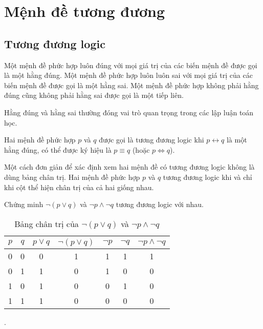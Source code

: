 \documentclass{standalone} %
\begin{document}

    \section{Mệnh đề tương đương}
    \subsection{Tương đương logic} 
        \begin{definition}
            Một mệnh đề phức hợp luôn đúng với mọi giá trị của các biến mệnh đề được gọi là một hằng đúng. Một mệnh đề phức hợp luôn luôn sai với mọi giá trị của các biến mệnh đề được gọi là một hằng sai. Một mệnh đề phức hợp không phải hằng đúng cũng không phải hằng sai được gọi là một tiếp liên.
        \end{definition}
        
        Hằng đúng và hằng sai thường đóng vai trò quan trọng trong các lập luận toán học.
        
        \begin{definition}
            Hai mệnh đề phức hợp $p$ và $q$ được gọi là tương đương logic khi $p \leftrightarrow q$ là một hằng đúng, có thể được ký hiệu là $p \equiv q$ (hoặc $p \Leftrightarrow q$).
        \end{definition}
        
        Một cách đơn giản để xác định xem hai mệnh đề có tương đương logic không là dùng bảng chân trị. Hai mệnh đề phức hợp $p$ và $q$ tương đương logic khi và chỉ khi cột thể hiện chân trị của cả hai giống nhau.
        
        \pagebreak
        \begin{example}
            Chứng minh $\neg (p \lor q)$ và $\neg p \land \neg q$ tương đương logic với nhau.
            \begin{table}[h!]
                \centering
                \setlength{\tabcolsep}{18pt}
                \begin{tabular}{c c c c c c c}
                    $p$ & $q$ & $p \lor q$ & $\neg (p \lor q)$ & $\neg p$ & $\neg q$ & $\neg p \land \neg q$\\ \hline
                    0 & 0 & 0 & 1 & 1 & 1 & 1\\
                    0 & 1 & 1 & 0 & 1 & 0 & 0\\
                    1 & 0 & 1 & 0 & 0 & 1 & 0\\
                    1 & 1 & 1 & 0 & 0 & 0 & 0 
                \end{tabular}
                \caption{Bảng chân trị của $\neg (p \lor q)$ và $\neg p \land \neg q$}.
            \end{table}
        \end{example}
        
\end{document}
